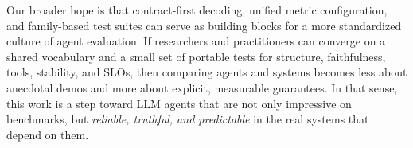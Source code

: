 Our broader hope is that contract-first decoding, unified metric configuration, and family-based test suites can serve as building blocks for a more standardized culture of agent evaluation.
If researchers and practitioners can converge on a shared vocabulary and a small set of portable tests for structure, faithfulness, tools, stability, and SLOs, then comparing agents and systems becomes less about anecdotal demos and more about explicit, measurable guarantees.
In that sense, this work is a step toward LLM agents that are not only impressive on benchmarks, but \emph{reliable, truthful, and predictable} in the real systems that depend on them.
